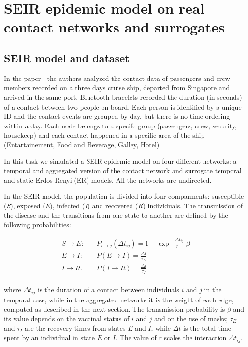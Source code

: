 \chapter{SEIR epidemic model on real contact networks and surrogates}


\section{SEIR model and dataset}
 
In the paper \cite{pung2022using}, the authors analyzed the contact data of passengers and crew members recorded on a three days cruise ship, departed from Singapore and arrived in the same port. Bluetooth bracelets recorded the duration  (in seconds) of a contact between two people on board. Each person is identified by a unique ID and the contact events are grouped by day, but there is no time ordering within a day. Each node belongs to a specifc group (passengers, crew, security, housekeep) and each contact happened in a specific area of the ship (Entartainement, Food and Beverage, Galley, Hotel).

In this task we  simulated a SEIR epidemic model on four different networks: a temporal and aggregated version of the contact network and surrogate temporal and static Erdos Renyi  (ER) models. All the networks are undirected.

In the SEIR model, the population is divided into four comparments: susceptible (\emph{S}), exposed (\emph{E}), infected (\emph{I}) and recovered (\emph{R}) individuals. The transmission of the disease and the transitions from one state to another are defined by the following probabilities:

\begin{align}\label{eq:epidemic}
    S \rightarrow E:&\quad P_{i\rightarrow j}(\Delta t_{ij}) = 1 - \exp{\frac{-\Delta t_{ij}}{r} \; \beta } \\
    E \rightarrow I:&\quad P( E \rightarrow I) = \frac{\Delta t}{\tau_E} \\
    I \rightarrow R:&\quad P( I \rightarrow R) = \frac{\Delta t}{\tau_I} \\
\end{align}


where $\Delta t_{ij}$ is the duration of a contact between  individuals $i$ and $j$ in the temporal case, while in the aggregated networks it is the weight of each edge, computed as described in the next section. The transmission probability is  $\beta$ and its value depends on the vaccinal status of $i$ and $j$ and on the use of masks; $\tau_E$ and $\tau_I$ are the recovery times from states $E$ and $I$, while $\Delta t$ is the total time spent by an individual in state $E$ or $I$. The value of $r$ scales the interaction  $\Delta t_{ij}$.





